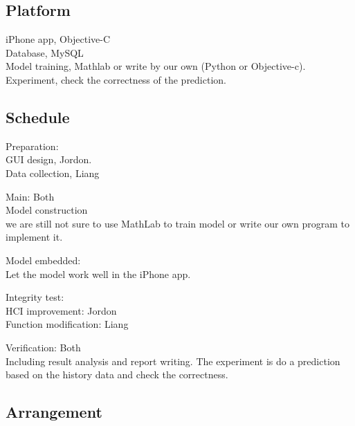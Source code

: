 \documentclass[12pt]{article}
\begin{document}
\subsection{Platform}
iPhone app, Objective-C\\
Database, MySQL\\
Model training, Mathlab or write by our own (Python or Objective-c).\\
Experiment, check the correctness of the prediction.\\

\subsection{Schedule}
Preparation: \\
    GUI design, Jordon. \\
    Data collection, Liang

Main: Both\\
    Model construction \\  
    we are still not sure to use MathLab to train model or write our
    own program to implement it.

    Model embedded: \\
    Let the model work well in the iPhone app.

Integrity test: \\
    HCI improvement: Jordon \\ 
    Function modification:  Liang 

Verification: Both\\
    Including result analysis and report writing. The experiment is do
    a prediction based on the history data and check the correctness.

\subsection{Arrangement}
  \begin{gantt}{7}{8}
    \begin{ganttitle}
    \end{ganttitle}
  \end{gantt}




\end{document}
